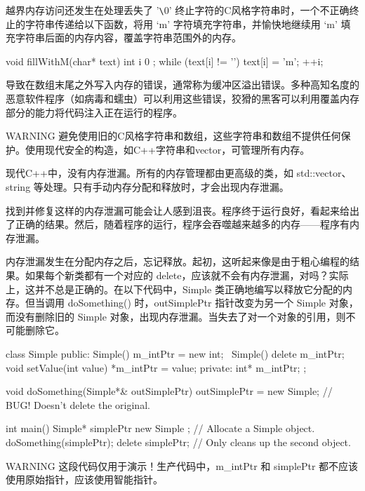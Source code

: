 越界内存访问还发生在处理丢失了 '\verb|\|0' 终止字符的C风格字符串时，一个不正确终止的字符串传递给以下函数，将用 ‘m’ 字符填充字符串，并愉快地继续用 ‘m’ 填充字符串后面的内存内容，覆盖字符串范围外的内存。

\begin{cpp}
void fillWithM(char* text)
{
    int i { 0 };
    while (text[i] != '\0') {
        text[i] = 'm';
        ++i;
    }
}
\end{cpp}

导致在数组末尾之外写入内存的错误，通常称为缓冲区溢出错误。多种高知名度的恶意软件程序（如病毒和蠕虫）可以利用这些错误，狡猾的黑客可以利用覆盖内存部分的能力将代码注入正在运行的程序。

\begin{myWarning}{WARNING}
避免使用旧的C风格字符串和数组，这些字符串和数组不提供任何保护。使用现代安全的构造，如C++字符串和vector，可管理所有内存。
\end{myWarning}


现代C++中，没有内存泄漏。所有的内存管理都由更高级的类，如 std::vector、string 等处理。只有手动内存分配和释放时，才会出现内存泄漏。

找到并修复这样的内存泄漏可能会让人感到沮丧。程序终于运行良好，看起来给出了正确的结果。然后，随着程序的运行，程序会吞噬越来越多的内存——程序有内存泄漏。

内存泄漏发生在分配内存之后，忘记释放。起初，这听起来像是由于粗心编程的结果。如果每个新类都有一个对应的 delete，应该就不会有内存泄漏，对吗？实际上，这并不总是正确的。在以下代码中，Simple 类正确地编写以释放它分配的内存。但当调用 doSomething() 时，outSimplePtr 指针改变为另一个 Simple 对象，而没有删除旧的 Simple 对象，出现内存泄漏。当失去了对一个对象的引用，则不可能删除它。

\begin{cpp}
class Simple
{
    public:
    Simple() { m_intPtr = new int{}; }
    ~Simple() { delete m_intPtr; }
    void setValue(int value) { *m_intPtr = value; }
    private:
    int* m_intPtr;
};

void doSomething(Simple*& outSimplePtr)
{
    outSimplePtr = new Simple{}; // BUG! Doesn't delete the original.
}

int main()
{
    Simple* simplePtr { new Simple{} }; // Allocate a Simple object.
    doSomething(simplePtr);
    delete simplePtr; // Only cleans up the second object.
}
\end{cpp}

\begin{myWarning}{WARNING}
这段代码仅用于演示！生产代码中，m\_intPtr 和 simplePtr 都不应该使用原始指针，应该使用智能指针。
\end{myWarning}

